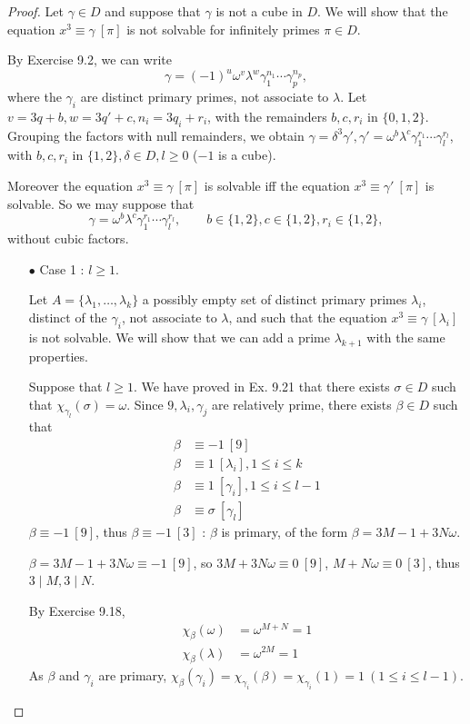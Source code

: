 \documentclass[11pt,a4paper]{article}
\begin{document}
\begin{proof}
Let $\gamma \in D$ and suppose that $\gamma$ is not a cube in $D$. We will show that the equation $x^3 \equiv \gamma \ [\pi]$ is not solvable for infinitely primes $\pi \in D$.

By Exercise 9.2, we can write
$$\gamma = (-1)^u\omega^v \lambda^w \gamma_1^{n_1}\cdots\gamma_p^{n_p},$$
where the $\gamma_i$ are distinct primary primes, not associate to $\lambda$. Let $v = 3q + b, w = 3q' +c, n_i = 3q_i +r_i$, with the remainders $b,c,r_i$ in $\{0,1,2\}$. Grouping the factors with null remainders, we obtain $\gamma = \delta^3 \gamma', \gamma' = \omega^b \lambda^c\gamma_1^{r_1}\cdots \gamma_l^{r_l}$, with  $b,c,r_i$ in $\{1,2\}, \delta \in D, l \geq 0$ ($-1$ is a cube).

Moreover the equation $x^3 \equiv \gamma \ [\pi]$ is solvable iff the equation $x^3 \equiv \gamma'\ [\pi]$ is solvable. So we may suppose that 
$$\gamma =  \omega^b \lambda^c\gamma_1^{r_1}\cdots \gamma_l^{r_l},\qquad b\in \{1,2\}, c\in \{1,2\}, r_i \in \{1,2\},$$
without cubic factors.

\begin{enumerate}
\item[$\bullet$] Case 1 : $l\geq 1$.

Let $A = \{\lambda_1,\ldots,\lambda_k\}$ a possibly empty set of distinct primary primes $\lambda_i$, distinct of the $\gamma_i$, not associate to $\lambda$,  and such that the equation $x^3 \equiv \gamma \ [\lambda_i]$ is not solvable. We will show that we can add a prime $\lambda_{k+1}$ with the same properties.

Suppose that $l\geq 1$. We have proved in Ex. 9.21 that there exists $\sigma \in D$ such that $\chi_{\gamma_l}(\sigma) = \omega$. Since $9,\lambda_i, \gamma_j$ are relatively prime, there exists $\beta \in D$ such that
\begin{align*}
\beta &\equiv -1\ [9]\\
\beta & \equiv 1 \ [\lambda_i], 1 \leq i \leq k\\
\beta & \equiv 1 \ [\gamma_i], 1 \leq i \leq l-1\\
\beta & \equiv \sigma\  [\gamma_l]
\end{align*}
$\beta \equiv -1 \ [9]$, thus $\beta \equiv -1 \ [3]$ : $\beta$ is primary, of the form $\beta = 3M-1+3N\omega$.

$\beta = 3M-1+3N\omega \equiv -1 \ [9]$, so $3M+3N\omega \equiv 0 \ [9]$, $M+N\omega \equiv 0 \ [3]$, thus $3\mid M,3\mid N$.

By Exercise 9.18,
\begin{align*}
\chi_\beta(\omega) &= \omega^{M+N} = 1\\
\chi_\beta(\lambda) &= \omega^{2M} = 1
\end{align*}
As $\beta$ and $\gamma_i$ are primary, $\chi_\beta(\gamma_i) = \chi_{\gamma_i}(\beta) = \chi_{\gamma_i}(1) = 1\ (1\leq i \leq l-1)$. 


\end{enumerate}
\end{proof}
\end{document}

